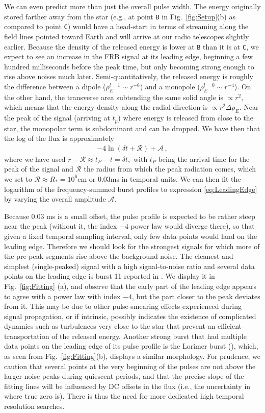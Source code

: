 \documentclass{aa}
\newcommand{\bea}{\begin{eqnarray}}
\newcommand{\eea}{\end{eqnarray}}
\begin{document}
We can even predict more than just the overall pulse width. The energy originally stored farther away from the star (e.g., at point \verb!B! in Fig.~\ref{fig:Setup}(b) as compared to point \verb!C!) would have a head-start in terms of streaming along the field lines pointed toward Earth and will arrive at our radio telescopes slightly earlier. Because the density of the released energy
is lower at \verb!B! than it is at \verb!C!, we expect to see an increase in the FRB signal at its leading edge, beginning a few hundred milliseconds before the peak time, but only becoming strong enough to rise above noises much later. Semi-quantitatively, the released energy is roughly the difference between a dipole ($\rho_E^{l=1} \sim r^{-6}$) and a monopole ($\rho_E^{l=0} \sim r^{-4}$). On the other hand, the transverse area subtending the same solid angle is $\propto r^2$, which means that the energy density along the radial direction is $\propto r^2 \Delta \rho_E$.  
Near the peak of the signal (arriving at $t_p$) where energy is released from close to the star, the monopolar term is subdominant and can be dropped. We have then that the log of the flux is approximately 
\bea \label{eq:LeadingEdge}
-4\ln(\delta t +\mathcal{R})+\mathcal{A}\,,
\eea
where we have used $r-\mathcal{R}\approx t_P-t =\delta t,$ with $t_P$ being the arrival time for the peak of the signal and $\mathcal{R}$ the radius from which the peak radiation comes, which we set to $\mathcal{R}\approx R_* =10^6$cm or $0.03$ms in temporal units. We can then fit the logarithm of the frequency-summed burst profiles to expression \eqref{eq:LeadingEdge} by varying the overall amplitude $\mathcal{A}$. 

Because $0.03  $ ms is a small offset, the pulse profile is expected to be rather steep near the peak (without it, the index $-4$ power law would diverge there), so that given a fixed temporal sampling interval, only few data points would land on the leading edge. Therefore we should look for the strongest signals for
which more of the pre-peak segments rise above the background noise. The cleanest and simplest (single-peaked) signal with a high signal-to-noise ratio and several data points on the leading edge is burst 11 reported in \cite{Spitler:2016dmz}. 
We display it in Fig.~\ref{fig:Fitting} (a), and observe that the early part of the leading edge appears to agree with a power law with index $-4$, but the part closer to the peak deviates from it. This may be due to other pulse-smearing effects experienced during signal propagation, or if intrinsic, possibly indicates the existence of complicated dynamics such as turbulences very close to the star that prevent an efficient transportation of the released energy. 
Another strong burst that had multiple data points on the leading edge of its pulse profile is the Lorimer burst (\cite{2007Sci...318..777L}), which, as seen from Fig.~\ref{fig:Fitting}(b), displays a similar morphology.  
For prudence, we caution that several points at the very beginning of the pulses are not above the larger noise peaks during quiescent periods, and that the precise slope of the fitting lines will be influenced by DC offsets in the flux (i.e., the uncertainty in where true zero is). There is thus the need for more dedicated high temporal resolution searches. 
\end{document}
